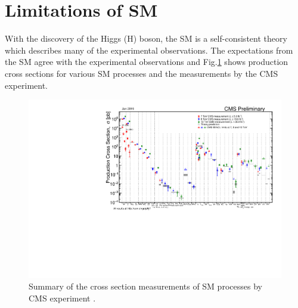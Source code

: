 \section{Limitations of SM}
\label{SMLimitations}
With the discovery of the Higgs (H) boson, the SM is a self-consistent theory which describes many of the experimental observations. The expectations from the SM agree with the experimental observations and Fig.\ref{fig:SigmaNew_v0} shows production cross sections for various SM processes and the measurements by the CMS experiment.
\begin{figure}[h]
\centering
\includegraphics[width=0.9\linewidth]{../Figures/Chap1/SigmaNew_v0}
\caption[SM cross section measurements by CMS]{Summary of the cross section measurements of SM processes by CMS experiment \cite{SMxsec}.}
\label{fig:SigmaNew_v0}
\end{figure}

